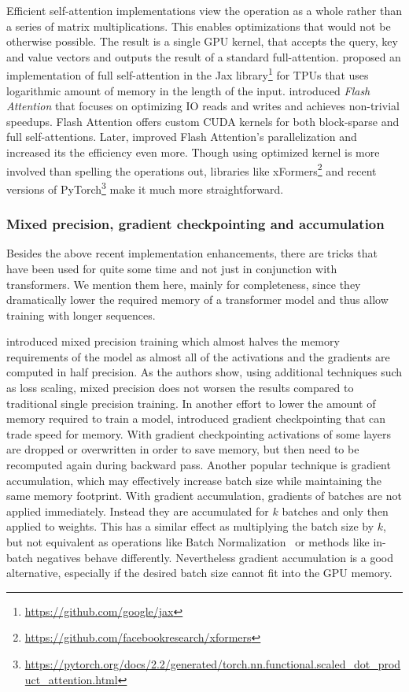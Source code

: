 Efficient self-attention implementations view the operation as a whole rather
than a series of matrix multiplications. This enables optimizations that would
not be otherwise possible. The result is a single GPU kernel, that accepts the
query, key and value vectors and outputs the result of a standard
full-attention. \cite{rabe2021self} proposed an implementation of full
self-attention in the Jax
library\footnote{\url{https://github.com/google/jax}} for TPUs that uses
logarithmic amount of memory in the length of the input.
\cite{dao2022flashattention} introduced \emph{Flash Attention} that focuses on
optimizing IO reads and writes and achieves non-trivial speedups. Flash
Attention offers custom CUDA kernels for both block-sparse and full
self-attentions. Later, \cite{dao2023flashattention} improved Flash Attention's
parallelization and increased its the efficiency even more. Though using
optimized kernel is more involved than spelling the operations out, libraries
like xFormers\footnote{\url{https://github.com/facebookresearch/xformers}} and
recent versions of
PyTorch\footnote{\url{https://pytorch.org/docs/2.2/generated/torch.nn.functional.scaled_dot_product_attention.html}}
make it much more straightforward.

\subsubsection{Mixed precision, gradient checkpointing and accumulation}

Besides the above recent implementation enhancements, there are tricks that
have been used for quite some time and not just in conjunction with
transformers. We mention them here, mainly for completeness, since they
dramatically lower the required memory of a transformer model and thus allow
training with longer sequences.

\cite{micikevicius2017mixed} introduced mixed precision training which almost
halves the memory requirements of the model as almost all of the activations
and the gradients are computed in half precision. As the authors show, using
additional techniques such as loss scaling, mixed precision does not worsen the
results compared to traditional single precision training. In another effort to
lower the amount of memory required to train a model, \cite{chen2016training}
introduced gradient checkpointing that can trade speed for memory. With
gradient checkpointing activations of some layers are dropped or overwritten in
order to save memory, but then need to be recomputed again during backward
pass. Another popular technique is gradient accumulation, which may effectively
increase batch size while maintaining the same memory footprint. With gradient
accumulation, gradients of batches are not applied immediately. Instead they
are accumulated for $k$ batches and only then applied to weights. This has a
similar effect as multiplying the batch size by $k$, but not equivalent as
operations like Batch Normalization~\citep{ioffe2015batch} or methods like
in-batch negatives behave differently. Nevertheless gradient accumulation is a
good alternative, especially if the desired batch size cannot fit into the GPU
memory.

